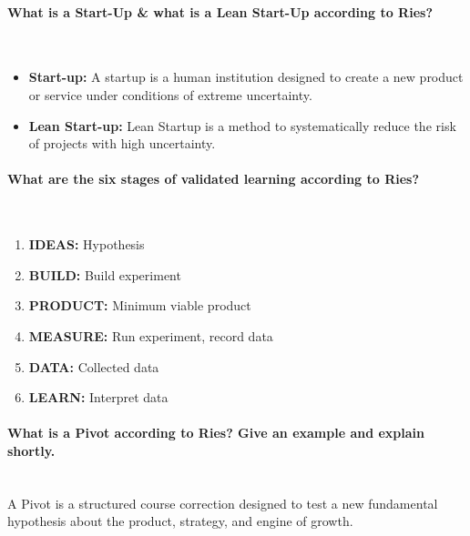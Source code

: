 \documentclass[10pt,a4paper,noendnumber=true]{scrartcl}
\newcommand{\properparagraph}[1]{\paragraph{\textcolor{Emerald}{#1}}\mbox{}\\}
\begin{document}
\properparagraph{What is a Start-Up \& what is a Lean Start-Up according to Ries?}
\begin{itemize}
	\item \textbf{Start-up:} A startup is a human institution designed to create a new product or service under conditions of extreme uncertainty.
	\item \textbf{Lean Start-up:} Lean Startup is a method to systematically reduce the risk of	projects with high uncertainty.
\end{itemize}

\properparagraph{What are the six stages of validated learning according to Ries?}
\begin{enumerate}
	\item \textbf{IDEAS:} Hypothesis
	\item \textbf{BUILD:} Build experiment
	\item \textbf{PRODUCT:} Minimum viable product
	\item \textbf{MEASURE:} Run experiment, record data
	\item \textbf{DATA:} Collected data
	\item \textbf{LEARN:} Interpret data
\end{enumerate}

\properparagraph{What is a Pivot according to Ries? Give an example and explain shortly.}
A Pivot is a structured course correction designed to test a new fundamental hypothesis about the product, strategy, and engine of growth.






\newpage
\end{document}
